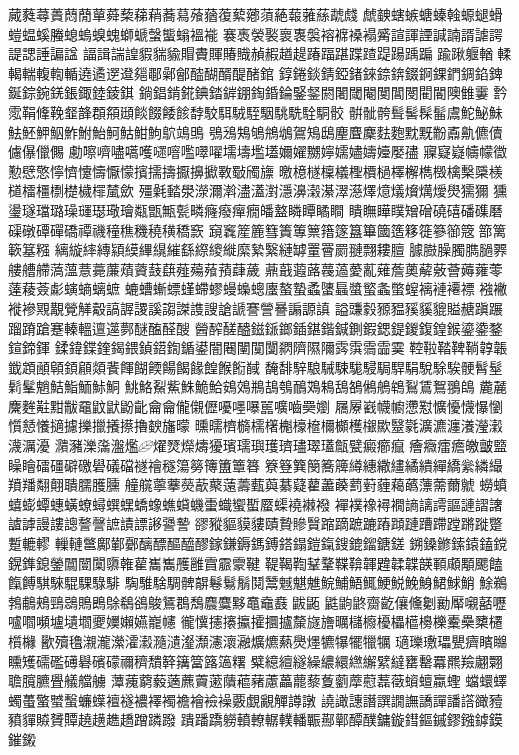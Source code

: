 蕆蕤蕁蕢蕄蕑蕇蕣蔾蕛蕱蕎蕮蕵蕕蕧蕠薌蕦蕝蕔蕥蕬虣虥
虤螤螛螏螗螓螒螈螁螖螘蝹螇螣螅螐螑螝螄螔螜螚螉褞褦
褰褭褮褧褱褢褩褣褯褬褟觱諠諢諲諴諵諝謔諤諟諰諈諞諡
諨諿諯諻貑貒貐賵賮賱賰賳赬赮趥趧踳踾踸蹀蹅踶踼踽蹁
踰踿躽輶輮輵輲輹輷輴遶遹遻邆郺鄳鄵鄶醓醐醑醍醏錧
錞錈錟錆錏鍺錸錼錛錣錒錁鍆錭錎錍鋋錝鋺錓鋹鋷錴錂錤
鋿錩錹錵錪錔錌錋鋾錉錀鋻錖閼闍閾閹閺閶閿閵閽隩雔霋
霒霐鞙鞗鞔韰韸頵頯頲餤餟餧餩馞駮駬駥駤駰駣駪駩駧骹
骿骴骻髶髺髹髷鬳鮀鮅鮇魼魾魻鮂鮓鮒鮐魺鮕魽鮈鴥鴗鴠
鴞鴔鴩鴝鴘鴢鴐鴙鴟麈麆麇麮麭黕黖黺鼒鼽儦儥儢儤儠儩
勴嚓嚌嚍嚆嚄嚃噾嚂噿嚁壖壔壏壒嬭嬥嬲嬣嬬嬧嬦嬯嬮孻
寱寲嶷幬幪徾懃憵憼懧懠懥懤懨懞擯擩擣擫擤擨斁斀斶旚
曒檍檖檁檥檉檟檛檡檞檇檓檎檕檃檨檤檑橿檦檚檅檌檒歛
殭氉濌澩濴濔濣濜濭濧濦濞濲濝濢濨燡燱燨燲燤燰燢獳獮
獯璗璲璫璐璪璭璱璥璯甐甑甒甏疄癃癈癉癇皤盩瞵瞫瞲瞷
瞶瞴瞱瞨矰磳磽礂磻磼磿磲礅磹磾礄禫禨穜穛穖穘穔穚窾
竀竁簅簏篲簀篿篻簎篴簋篳簂簉簃簁篸篽簆篰篱簐簊糨
縭縼繂縳顈縸縪繉繀繇縩繌縰縻縶繄縺罅罿罾罽翴翲耬膻
臄臌臊臅臇膼臩艛艚艜薃薀薏薧薕薠薋薣蕻薤薚薞蕷蕼薉
薡蕺蕸蕗薎薖薆薍薙薝薁薢薂薈薅蕹蕶薘薐薟虨螾螪螭蟅
螰螬螹螵螼螮蟉蟃蟂蟌螷螯蟄蟊螴螶螿螸螽蟞螲褵褳褼褾
襁襒褷襂覭覯覮觲觳謞謘謖謑謅謋謢謏謒謕謇謍謈謆謜謓
謚豏豰豲豱豯貕貔賹赯蹎蹍蹓蹐蹌蹇轃轀邅遾鄸醚醢醛醙
醟醡醝醠鎡鎃鎯鍤鍖鍇鍼鍘鍜鍶鍉鍐鍑鍠鍭鎏鍌鍪鍹鍗鍕
鍒鍏鍱鍷鍻鍡鍞鍣鍧鍎鍙闇闀闉闃闅閷隮隰隬霠霟霘霝霙
鞚鞡鞜鞞鞝韕韔韱顁顄顊顉顅顃餥餫餬餪餳餲餯餭餱餰馘
馣馡騂駺駴駷駹駸駶駻駽駾駼騃骾髾髽鬁髼魈鮚鮨鮞鮛鮦
鮡鮥鮤鮆鮢鮠鮯鴳鵁鵧鴶鴮鴯鴱鴸鴰鵅鵂鵃鴾鴷鵀鴽翵鴭
麊麉麍麰黈黚黻黿鼤鼣鼢齔⿕龠儱儭儮嚘嚜嚗嚚嚝嚙奰嬼
屩屪巀幭幮懘懟懭懮懱懪懰懫懖懩擿攄擽擸攁攃擼斔旛曚
曛曘櫅檹檽櫡櫆檺檶檷櫇檴檭歞毉氋瀇瀌瀍瀁瀅瀔瀎濿瀀
濻瀦濼濷瀊爁燿燹爃燽獶璸瓀璵瓁璾璶璻瓂甔甓癜癤癙
癐癓癗癚皦皽盬矂瞺礌礓礔礉礐礒礑禭禬穟簜簩簙簠簟簭
簝簦簨簢簥簰繜繐繖繣繘繢繟繑繠繗繓羵羳翷翸聵臑臒臐
艟艞薴藆藀藃藂薳薵薽藇藄薿藋藎藈藅薱薶藒蘤薸薷薾虩
蟧蟦蟢蟛蟫蟪蟥蟟蟳蟤蟔蟜蟓蟭蟘蟣蟗蟙蠁蟴蟨蟝襓襋襏
襌襆襐襑襉謪謧謣謳謰謵譇謯謼謾謱謥謷謦謶謮謤謻謽謺
豂豵貙貘貗賾贄贂贀蹜蹢蹠蹗蹖蹞蹥蹧蹛蹚蹡蹝蹩蹔轆轇
轈轋鄨鄺鄻鄾醨醥醧醯醪鎵鎌鎒鎷鎛鎝鎉鎧鎎鎪鎞鎦鎕鎈
鎙鎟鎀鎍鎱鎑鎲鎤鎨鎴鎣闒闓闑隳雗雚巂雟雘雝霣霢霥鞬
鞮鞨鞫鞤鞪鞢鞥韗韙韖韘韺顐顑顒颸饁餼餺騏騋騉騍騄騑
騊騅騇騆髀髜鬈鬄鬅鬩鬵魊魌魋鯇鯆鯃鮿鯁鮵鮸鯓鮶鯄鮹
鮽鵜鵓鵏鵊鵛鵋鵙鵖鵌鵗鵒鵔鵟鵘鵚麎麌黟鼁鼀鼖鼥鼫
鼪鼩鼨齌齕儴儵劖勷厴嚫嚭嚦嚧嚪嚬壚壝壛夒嬽嬾嬿巃幰
徿懻攇攐攍攉攌攎斄旞旝曞櫧櫠櫌櫑櫙櫋櫟櫜櫐櫫櫏櫍櫞
歠殰氌瀙瀧瀠瀖瀫瀡瀢瀣瀩瀗瀤瀜爌爊爇爂爅犥犦犤犣犡
瓋瓅璷瓃甖癠矉矊矄矱礝礛礡礜礗礞禰穧穨簳簼簹簬簻糬
糪繶繵繸繰繷繯繺繲繴繨罋罊羃羆羷翽翾聸臗臕舋艤艡艣
藫藱藭藙藡藨藚藗藬藲藸藘藟藣藜藑藰藦藯藞藢蠀蟺蠃蟶
蟷蠉蠌蠋蠆蟼蠈蟿蠊蠂襢襚襛襗襡襜襘襝襙覈覷覶觶譐譈
譊譀譓譖譔譋譕譑譂譒譗豃豷豶貚贆贇贉趬趪趭趫蹭蹸蹳
蹪蹯蹻軂轒轑轏轐轓辴酀鄿醰醭鏞鏇鏏鏂鏚鏐鏹鏬鏌鏙鎩
